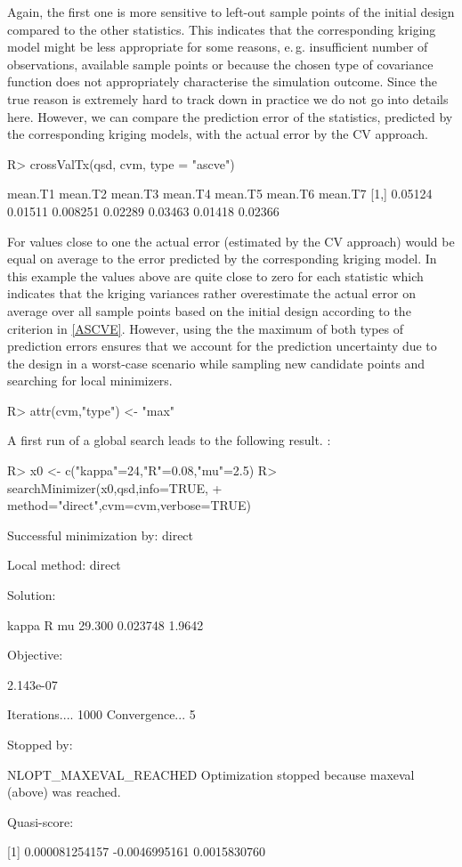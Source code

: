 \documentclass[article, nojss]{jss}
\numberwithin{equation}{section}			%
\begin{document}
Again, the first one is more sensitive to left-out sample points of
the initial design compared to the other statistics. This indicates that
the corresponding kriging model might be less appropriate for some reasons,
e.\,g. insufficient number of observations, available sample points or because
the chosen type of covariance function does not appropriately characterise
the simulation outcome. Since the true reason is extremely hard to track down in practice
we do not go into details here. However, we can compare the prediction error of
the statistics, predicted by the corresponding kriging models, with the actual
error by the CV approach.
\begin{Schunk}
\begin{Sinput}
R> crossValTx(qsd, cvm, type = "ascve")
\end{Sinput}
\begin{Soutput}
     mean.T1 mean.T2  mean.T3 mean.T4 mean.T5 mean.T6 mean.T7
[1,] 0.05124 0.01511 0.008251 0.02289 0.03463 0.01418 0.02366
\end{Soutput}
\end{Schunk}
For values close to one the actual error (estimated by the CV approach) would be
equal on average to the error predicted by the corresponding kriging model. In this example the values
above are quite close to zero for each statistic which indicates that the
kriging variances rather overestimate the actual error on average over all
sample points based on the initial design according to the criterion in
\eqref{ASCVE}. However, using the the maximum of both types of prediction errors
ensures that we account for the prediction uncertainty due to the design in a
worst-case scenario while sampling new candidate points and searching for local minimizers.
\begin{Schunk}
\begin{Sinput}
R> attr(cvm,"type") <- "max"
\end{Sinput}
\end{Schunk}
A first run of a global search leads to the following result.
:
\begin{Schunk}
\begin{Sinput}
R> x0 <- c("kappa"=24,"R"=0.08,"mu"=2.5)
R> searchMinimizer(x0,qsd,info=TRUE,
+ 		method="direct",cvm=cvm,verbose=TRUE)
\end{Sinput}
\begin{Soutput}
Successful minimization by:  direct 

Local method:  direct 

Solution: 

   kappa           R          mu    
  29.300    0.023748      1.9642    

Objective:

 2.143e-07 

Iterations.... 1000 
Convergence... 5 

Stopped by: 

 NLOPT_MAXEVAL_REACHED 
 Optimization stopped because maxeval (above) was reached. 

Quasi-score:

[1]    0.000081254157    -0.0046995161     0.0015830760  
\end{Soutput}
\end{Schunk}
\end{document}
